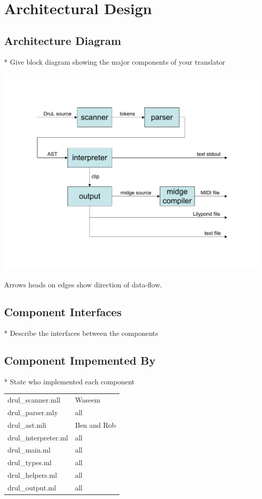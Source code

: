
\chapter{Architectural Design}

\section{Architecture Diagram}
* Give block diagram showing the major components of your translator

\includegraphics[width=150mm]{Architecture_diagram.pdf}

Arrows heads on edges show direction of data-flow.

\section{Component Interfaces}
* Describe the interfaces between the components

\section{Component Impemented By}
* State who implemented each component

\begin{tabular}{ | l | l | } \hline

	drul_scanner.mll & Waseem \\
	drul_parser.mly & all \\
	drul_ast.mli & Ben and Rob \\
	drul_interpreter.ml & all \\
	drul_main.ml & all \\
	drul_types.ml & all \\
	drul_helpers.ml & all \\
	drul_output.ml & all \\

\end{tabular}
